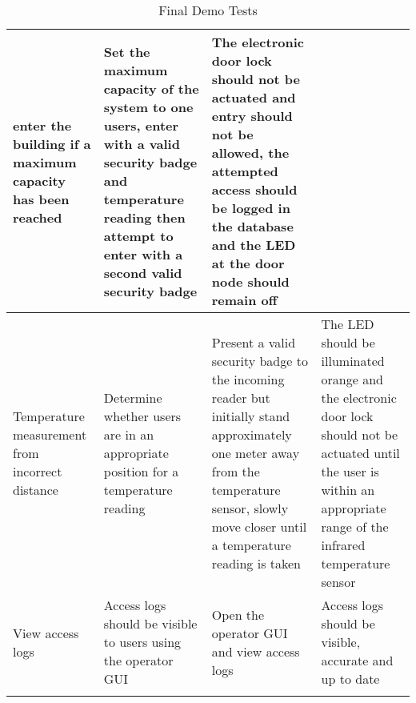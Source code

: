 \begin{longtable}[htb]{>{\centering\arraybackslash}m{3cm}|>{\centering\arraybackslash}m{3.5cm}|>{\centering\arraybackslash}m{3cm}|>{\centering\arraybackslash}m{3.5cm}}
enter the building if a maximum capacity has been reached & Set the maximum
capacity of the system to one users, enter with a valid security badge and
temperature reading then attempt to enter with a second valid security badge &
The electronic door lock should not be actuated and entry should not be allowed,
the attempted access should be logged in the database and the LED at the door
node should remain off \\
\hline
Temperature measurement from incorrect distance & Determine whether users are in
an appropriate position for a temperature reading & Present a valid security
badge to the incoming reader but initially stand approximately one meter away
from the temperature sensor, slowly move closer until a temperature reading is
taken & The LED should be illuminated orange and the electronic door lock should
not be actuated until the user is within an appropriate range of the infrared
temperature sensor \\
\hline
View access logs & Access logs should be visible to users using the operator GUI
& Open the operator GUI and view access logs & Access logs should be visible,
accurate and up to date \\
\bottomrule
\caption{Final Demo Tests}
\label{table:final-tests}
\end{longtable}

